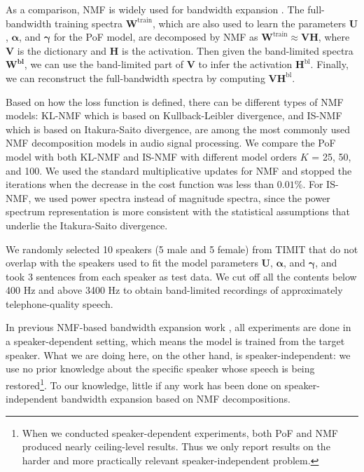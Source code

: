 \documentclass{article} %
\begin{document}
As a comparison, NMF is widely used for bandwidth expansion \cite{bansal2005bandwidth, raj2007bandwidth, sun2013non}. The full-bandwidth training spectra $\mathbf{W}^{\text{train}}$, which are also used to learn the parameters $\mathbf{U}$, $\bm{\alpha}$, and $\bm{\gamma}$ for the PoF model, are decomposed by NMF as $\mathbf{W}^{\text{train}} \approx \mathbf{V} \mathbf{H}$, where $\mathbf{V}$ is the dictionary and $\mathbf{H}$ is the activation. Then given the band-limited spectra $\mathbf{W^{\text{bl}}}$, we can use the band-limited part of $\mathbf{V}$ to infer the activation $\mathbf{H}^{\text{bl}}$. Finally, we can reconstruct the full-bandwidth spectra by computing $\mathbf{V}\mathbf{H}^{\text{bl}}$. 

Based on how the loss function is defined, there can be different types of NMF models: KL-NMF \cite{seung2001algorithms} which is based on Kullback-Leibler divergence, and IS-NMF \cite{neco09} which is based on Itakura-Saito divergence, are among the most commonly used NMF decomposition models in audio signal processing. We compare the PoF model with both KL-NMF and IS-NMF with different model orders $K$ = 25, 50, and 100. We used the standard multiplicative updates for NMF and stopped the iterations when the decrease in the cost function was less than $0.01\%$. For IS-NMF, we used power spectra instead of magnitude spectra, since the power spectrum representation is more consistent with the statistical assumptions that underlie the Itakura-Saito divergence. 

We randomly selected 10 speakers (5 male and 5 female) from TIMIT that do not overlap with the speakers used to fit the model parameters $\mathbf{U}$, $\bm{\alpha}$, and $\bm{\gamma}$, and took 3 sentences from each speaker as test data. We cut off all the contents below 400 Hz and above 3400 Hz to obtain band-limited recordings of approximately telephone-quality speech. 

In previous NMF-based bandwidth expansion work \cite{bansal2005bandwidth, raj2007bandwidth, sun2013non}, all experiments are done in a speaker-dependent setting, which means the model is trained from the target speaker. What we are doing here, on the other hand, is speaker-independent: we use no prior knowledge about the specific speaker whose speech is being restored\footnote{When we conducted speaker-dependent
experiments, both PoF and NMF produced nearly ceiling-level results. Thus we only report results on the harder and more practically relevant speaker-independent problem.}. To our knowledge, little if any work has been done on speaker-independent bandwidth expansion based on NMF decompositions. 
\end{document}
